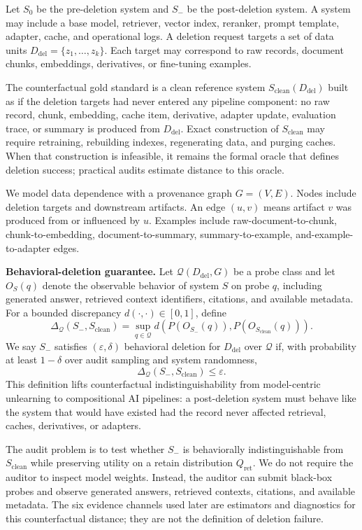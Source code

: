 \documentclass[10pt,journal,compsoc]{IEEEtran}
\begin{document}
Let $S_0$ be the pre-deletion system and $S_-$ be the post-deletion system. A system may include a base model, retriever, vector index, reranker, prompt template, adapter, cache, and operational logs. A deletion request targets a set of data units $D_{\mathrm{del}}=\{z_1,\ldots,z_k\}$. Each target may correspond to raw records, document chunks, embeddings, derivatives, or fine-tuning examples.

The counterfactual gold standard is a clean reference system $S_{\mathrm{clean}}(D_{\mathrm{del}})$ built as if the deletion targets had never entered any pipeline component: no raw record, chunk, embedding, cache item, derivative, adapter update, evaluation trace, or summary is produced from $D_{\mathrm{del}}$. Exact construction of $S_{\mathrm{clean}}$ may require retraining, rebuilding indexes, regenerating data, and purging caches. When that construction is infeasible, it remains the formal oracle that defines deletion success; practical audits estimate distance to this oracle.

We model data dependence with a provenance graph $G=(V,E)$. Nodes include deletion targets and downstream artifacts. An edge $(u,v)$ means artifact $v$ was produced from or influenced by $u$. Examples include raw-document-to-chunk, chunk-to-embedding, document-to-summary, summary-to-example, and-example-to-adapter edges.

\textbf{Behavioral-deletion guarantee.}
Let $\mathcal{Q}(D_{\mathrm{del}},G)$ be a probe class and let $O_S(q)$ denote the observable behavior of system $S$ on probe $q$, including generated answer, retrieved context identifiers, citations, and available metadata. For a bounded discrepancy $d(\cdot,\cdot)\in[0,1]$, define
\[
\Delta_{\mathcal{Q}}(S_-,S_{\mathrm{clean}})
=
\sup_{q\in\mathcal{Q}}
d\!\left(P(O_{S_-}(q)),P(O_{S_{\mathrm{clean}}}(q))\right).
\]
We say $S_-$ satisfies $(\varepsilon,\delta)$ behavioral deletion for $D_{\mathrm{del}}$ over $\mathcal{Q}$ if, with probability at least $1-\delta$ over audit sampling and system randomness,
\[
\Delta_{\mathcal{Q}}(S_-,S_{\mathrm{clean}})\leq \varepsilon.
\]
This definition lifts counterfactual indistinguishability from model-centric unlearning to compositional AI pipelines: a post-deletion system must behave like the system that would have existed had the record never affected retrieval, caches, derivatives, or adapters.

The audit problem is to test whether $S_-$ is behaviorally indistinguishable from $S_{\mathrm{clean}}$ while preserving utility on a retain distribution $Q_{\mathrm{ret}}$. We do not require the auditor to inspect model weights. Instead, the auditor can submit black-box probes and observe generated answers, retrieved contexts, citations, and available metadata. The six evidence channels used later are estimators and diagnostics for this counterfactual distance; they are not the definition of deletion failure.
\end{document}
